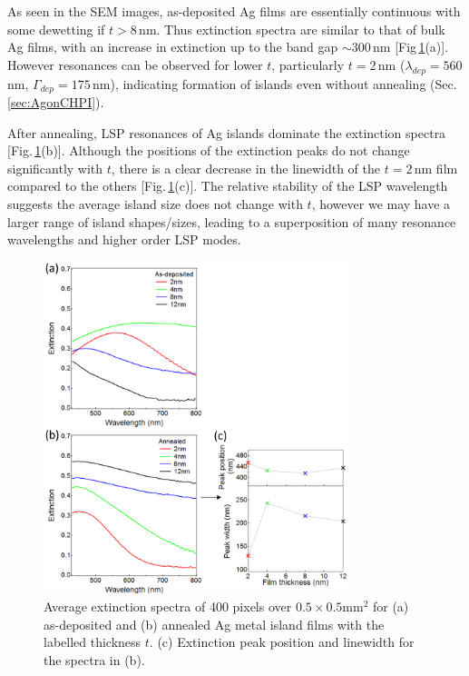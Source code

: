 As seen in the SEM images, as-deposited Ag films are essentially continuous with some dewetting if $t>8$\,nm. Thus extinction spectra are similar to that of bulk Ag films, with an increase in extinction up to the band gap $\sim300$\,nm [Fig\,\ref{6Fig6}(a)]. However resonances can be observed for lower $t$, particularly $t=2$\,nm ($\lambda_{dep} = 560$\,nm, $\Gamma_{dep} = 175$\,nm), indicating formation of islands even without annealing (Sec.\,\ref{sec:AgonCHPI}). 

After annealing, LSP resonances of Ag islands dominate the extinction spectra [Fig.\,\ref{6Fig6}(b)]. Although the positions of the extinction peaks do not change significantly with $t$, there is a clear decrease in the linewidth of the $t=2$\,nm film compared to the others [Fig.\,\ref{6Fig6}(c)]. The relative stability of the LSP wavelength suggests the average island size does not change with $t$, however we may have a larger range of island shapes/sizes, leading to a superposition of many resonance wavelengths and higher order LSP modes.
\begin{figure}[h!] 
\centering    
\includegraphics[width=0.8\textwidth]{Fig6}
\caption{Average extinction spectra of 400 pixels over $0.5\times0.5$mm$^2$ for (a) as-deposited and (b) annealed Ag metal island films with the labelled thickness $t$. (c) Extinction peak position and linewidth for the spectra in (b).}
\label{6Fig6}
\end{figure}

